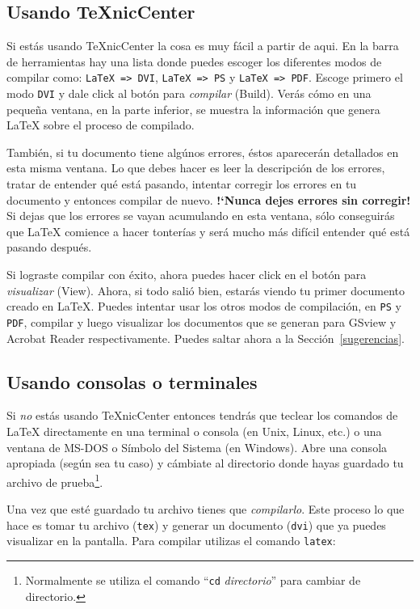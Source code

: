 \subsection{Usando \TeX{}nicCenter}

Si est\'as usando \TeX{}nicCenter la cosa es muy f\'acil a partir de aqui.
En la barra de herramientas hay una lista donde puedes escoger los diferentes
modos de compilar como: \verb|LaTeX => DVI|, \verb|LaTeX => PS|
y \verb|LaTeX => PDF|. Escoge primero el modo \texttt{DVI} y dale click al
bot\'on para \emph{compilar} (Build). Ver\'as c\'omo en una peque\~na ventana, en la parte
inferior, se muestra la informaci\'on que genera \LaTeX{} sobre el proceso de
compilado.

Tambi\'en, si tu documento tiene alg\'unos errores, \'estos aparecer\'an
detallados en esta misma ventana. Lo que debes hacer es leer la descripci\'on
de los errores, tratar de entender qu\'e est\'a pasando, intentar corregir los
errores en tu documento y entonces compilar de nuevo.
\textbf{!`Nunca dejes errores sin corregir!} Si dejas que los errores
se vayan acumulando en esta ventana, s\'olo conseguir\'as que \LaTeX{}
comience a hacer tonter\'ias y ser\'a mucho m\'as dif\'icil entender qu\'e
est\'a pasando despu\'es.

Si lograste compilar con \'exito, ahora puedes hacer click en el bot\'on
para \emph{visualizar} (View). Ahora, si todo sali\'o bien, estar\'as viendo
tu primer documento creado en \LaTeX{}. Puedes intentar usar los otros modos
de compilaci\'on, en \texttt{PS} y \texttt{PDF}, compilar y luego visualizar
los documentos que se generan para GSview y Acrobat Reader respectivamente.
Puedes saltar ahora a la Secci\'on~\ref{sugerencias}.


\subsection{Usando consolas o terminales}

Si \emph{no} est\'as usando \TeX{}nicCenter entonces tendr\'as que teclear los
comandos de \LaTeX{} directamente en una terminal o consola (en Unix, Linux,
etc.) o una ventana de MS-DOS o S\'imbolo del Sistema (en Windows).
Abre una consola apropiada (seg\'un sea tu caso) y c\'ambiate al directorio
donde hayas guardado tu archivo de prueba\footnote{Normalmente se utiliza 
el comando ``\texttt{cd} \textit{directorio}'' para cambiar de directorio.}.

Una vez que est\'e guardado tu archivo tienes que \emph{compilarlo}. Este proceso
lo que hace es tomar tu archivo (\texttt{tex}) y generar un documento
(\texttt{dvi}) que ya puedes visualizar en la pantalla. Para compilar utilizas
el comando \texttt{latex}:

